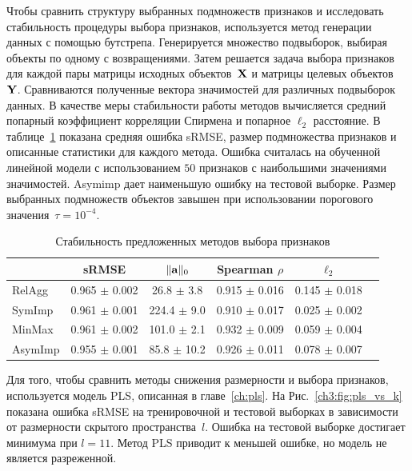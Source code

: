 Чтобы сравнить структуру выбранных подмножеств признаков и исследовать стабильность процедуры выбора признаков, используется метод генерации данных с помощью бутстрепа. 
Генерируется множество подвыборок, выбирая объекты по одному с возвращениями. 
Затем решается задача выбора признаков для каждой пары матрицы исходных объектов~$\mathbf{X}$ и  матрицы целевых объектов~$\mathbf{Y}$.
Сравниваются полученные вектора значимостей для различных подвыборок данных. 
В качестве меры стабильности работы методов вычисляется средний попарный коэффициент корреляции Спирмена и попарное $\ell_2$ расстояние.
В таблице~\ref{ch3:tbl:stability} показана средняя ошибка sRMSE, размер подмножества признаков и описанные статистики для каждого метода. 
Ошибка считалась на обученной линейной модели с использованием $50$ признаков с наибольшими значениями значимостей.
Asymimp дает наименьшую ошибку на тестовой выборке. 
Размер выбранных подмножеств объектов завышен при использовании порогового значения~$\tau=10^{-4}$. 

\begin{table}[!h]
	\caption{Стабильность предложенных методов выбора признаков}
	\centering
	\begin{tabular}{l|ccccc}
		\hline
		& sRMSE  & $\|\mathbf{a}\|_0$ & Spearman $\rho$ & $\ell_2$ \\ \hline
		RelAgg & 0.965 $\pm$ 0.002 & 26.8 $\pm$ 3.8 & 0.915 $\pm$ 0.016 & 0.145 $\pm$ 0.018   \\
		SymImp & 0.961 $\pm$ 0.001 & 224.4 $\pm$ 9.0 & 0.910 $\pm$ 0.017 & 0.025 $\pm$ 0.002   \\
		MinMax & 0.961 $\pm$ 0.002 & 101.0 $\pm$ 2.1& 0.932 $\pm$ 0.009 & 0.059 $\pm$ 0.004   \\
		AsymImp & 0.955 $\pm$ 0.001 & 85.8 $\pm$ 10.2& 0.926 $\pm$ 0.011 & 0.078 $\pm$ 0.007  \\ \hline
	\end{tabular}
	\label{ch3:tbl:stability}
\end{table}

Для того, чтобы сравнить методы снижения размерности и выбора признаков, используется модель PLS, описанная в главе~\ref{ch:pls}. 
На Рис.~\ref{ch3:fig:pls_vs_k} показана ошибка sRMSE на тренировочной и тестовой выборках в зависимости от размерности скрытого пространства~$l$.
Ошибка на тестовой выборке достигает минимума при $l = 11$.
Метод PLS приводит к меньшей ошибке, но модель не является разреженной.


